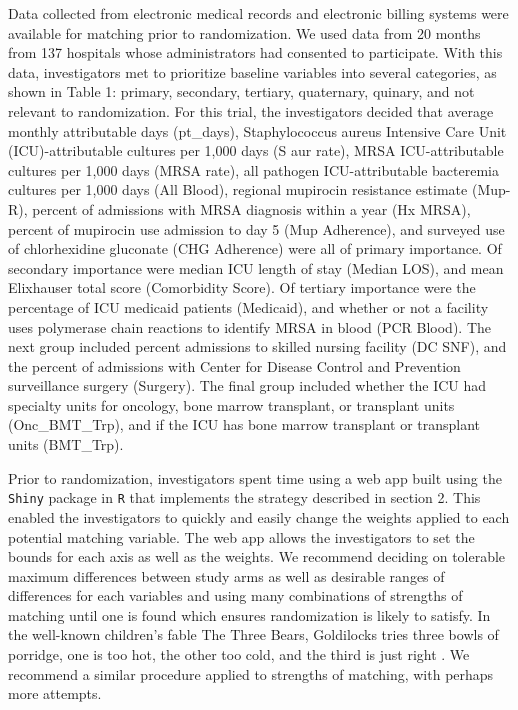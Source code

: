 \documentclass[]{article}
\begin{document}
Data collected from electronic medical records and electronic billing
systems were available for matching prior to randomization. We used data
from 20 months from 137 hospitals whose administrators had consented to
participate. With this data, investigators met to prioritize baseline
variables into several categories, as shown in Table 1: primary,
secondary, tertiary, quaternary, quinary, and not relevant to
randomization. For this trial, the investigators decided that average
monthly attributable days (pt\_days), Staphylococcus aureus Intensive
Care Unit (ICU)-attributable cultures per 1,000 days (S aur rate), MRSA
ICU-attributable cultures per 1,000 days (MRSA rate), all pathogen
ICU-attributable bacteremia cultures per 1,000 days (All Blood),
regional mupirocin resistance estimate (Mup-R), percent of admissions
with MRSA diagnosis within a year (Hx MRSA), percent of mupirocin use
admission to day 5 (Mup Adherence), and surveyed use of chlorhexidine
gluconate (CHG Adherence) were all of primary importance. Of secondary
importance were median ICU length of stay (Median LOS), and mean
Elixhauser total score (Comorbidity Score). Of tertiary importance were
the percentage of ICU medicaid patients (Medicaid), and whether or not a
facility uses polymerase chain reactions to identify MRSA in blood (PCR
Blood). The next group included percent admissions to skilled nursing
facility (DC SNF), and the percent of admissions with Center for Disease
Control and Prevention surveillance surgery (Surgery). The final group
included whether the ICU had specialty units for oncology, bone marrow
transplant, or transplant units (Onc\_BMT\_Trp), and if the ICU has bone
marrow transplant or transplant units (BMT\_Trp).

Prior to randomization, investigators spent time using a web app built
using the \texttt{Shiny} package in \texttt{R} that implements the
strategy described in section 2. This enabled the investigators to
quickly and easily change the weights applied to each potential matching
variable. The web app allows the investigators to set the bounds for
each axis as well as the weights. We recommend deciding on tolerable
maximum differences between study arms as well as desirable ranges of
differences for each variables and using many combinations of strengths
of matching until one is found which ensures randomization is likely to
satisfy. In the well-known children's fable The Three Bears, Goldilocks
tries three bowls of porridge, one is too hot, the other too cold, and
the third is just right \citep{3Bears}. We recommend a similar procedure
applied to strengths of matching, with perhaps more attempts.
\end{document}
